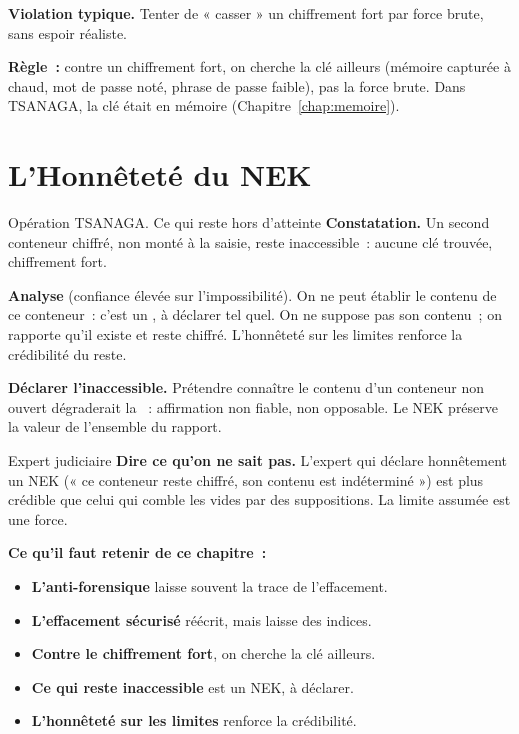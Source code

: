 \begin{boxalert}
\textbf{Violation typique.} Tenter de « casser » un chiffrement fort par force
brute, sans espoir réaliste.

\smallskip
\textbf{Règle~:} contre un chiffrement fort, on cherche la clé ailleurs
(mémoire capturée à chaud, mot de passe noté, phrase de passe faible), pas la
force brute. Dans TSANAGA, la clé était en mémoire
(Chapitre~\ref{chap:memoire}).
\end{boxalert}

\section{L'Honnêteté du NEK}
\label{sec:c16-nek}

\begin{boxscenario}{Opération TSANAGA. Ce qui reste hors d'atteinte}
\textbf{Constatation.} Un second conteneur chiffré, non monté à la saisie,
reste inaccessible~: aucune clé trouvée, chiffrement fort.

\medskip
\textbf{Analyse} (confiance élevée sur l'impossibilité). On ne peut établir le
contenu de ce conteneur~: c'est un , à déclarer tel quel. On ne
suppose pas son contenu~; on rapporte qu'il existe et reste chiffré. L'honnêteté
sur les limites renforce la crédibilité du reste.
\end{boxscenario}

\begin{boxCRO}
\textbf{Déclarer l'inaccessible.} Prétendre connaître le contenu d'un
conteneur non ouvert dégraderait la ~: affirmation non fiable,
non opposable. Le NEK préserve la valeur de l'ensemble du rapport.
\end{boxCRO}

\begin{boxmetier}{Expert judiciaire}
\textbf{Dire ce qu'on ne sait pas.} L'expert qui déclare honnêtement un NEK
(« ce conteneur reste chiffré, son contenu est indéterminé ») est plus crédible
que celui qui comble les vides par des suppositions. La limite assumée est une
force.
\end{boxmetier}

\separateur

\begin{boxresume}
\textbf{Ce qu'il faut retenir de ce chapitre~:}
\begin{itemize}
    \item \textbf{L'anti-forensique} laisse souvent la trace de
          l'effacement.
    \item \textbf{L'effacement sécurisé} réécrit, mais laisse des indices.
    \item \textbf{Contre le chiffrement fort}, on cherche la clé ailleurs.
    \item \textbf{Ce qui reste inaccessible} est un NEK, à déclarer.
    \item \textbf{L'honnêteté sur les limites} renforce la crédibilité.
\end{itemize}
\end{boxresume}

